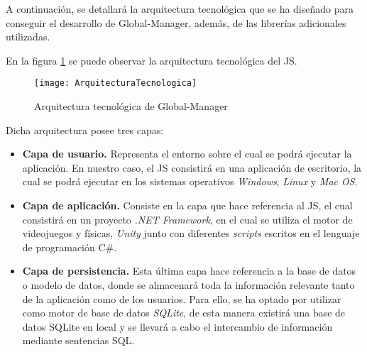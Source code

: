 A continuación, se detallará la arquitectura tecnológica que se ha diseñado para conseguir el desarrollo de Global-Manager, además, de las librerías adicionales utilizadas. 

En la figura \ref{fig:ArquitecturaTecnologica} se puede observar la arquitectura tecnológica del JS.

\begin{figure}[htb]
	\centering
	\texttt{[image: ArquitecturaTecnologica]}
	\caption[Arquitectura tecnológica de Global-Manager]{Arquitectura tecnológica de Global-Manager}
	\label{fig:ArquitecturaTecnologica}
\end{figure}

Dicha arquitectura posee tres capas:

\begin{itemize}
	\item \textbf{Capa de usuario.} Representa el entorno sobre el cual se podrá ejecutar la aplicación. En nuestro caso, el JS consistirá en una aplicación de escritorio, la cual se podrá ejecutar en los sistemas operativos \emph{Windows}, \emph{Linux} y \emph{Mac OS}.
	\item \textbf{Capa de aplicación.} Consiste en la capa que hace referencia al JS, el cual consistirá en un proyecto \emph{.NET Framework}, en el cual se utiliza el motor de videojuegos y físicas, \emph{Unity} junto con diferentes \emph{scripts} escritos en el lenguaje de programación C\#.  
	\item \textbf{Capa de persistencia.} Esta última capa hace referencia a la base de datos o modelo de datos, donde se almacenará toda la información relevante tanto de la aplicación como de los usuarios. Para ello, se ha optado por utilizar como motor de base de datos \emph{SQLite}, de esta manera existirá una base de datos SQLite en local y se llevará a cabo el intercambio de información mediante sentencias SQL.
\end{itemize}